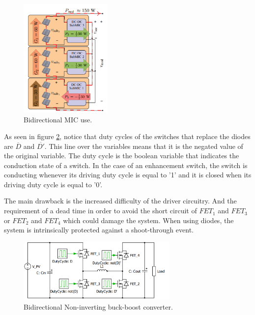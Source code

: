 \begin{figure}[htbp]
	\begin{center}
		\includegraphics[width=0.4\textwidth]{../Pictures/bidirectional_mic_use}
		\caption{Bidirectional MIC use\cite{ArchitectureMIC}.}
		\label{BID_MIC_ARCHITECTURES}
	\end{center}	
\end{figure}
		
		
As seen in figure \ref{BID_N_INV_BB_SCHEMATIC}, notice that duty cycles of the switches that replace the diodes are $\overline{D}$ and $\overline{D'}$. This line over the variables means that it is the negated value of the original variable. The duty cycle is the boolean variable that indicates the conduction state of a switch. In the case of an enhancement switch, the switch is conducting whenever its driving duty cycle is equal to '1' and it is closed when its driving duty cycle is equal to '0'. 
		
The main drawback is the increased difficulty of the driver circuitry. And the requirement of a dead time in order to avoid the short circuit of $FET_1$ and $FET_3$ or $FET_2$ and $FET_4$ which could damage the system. When using diodes, the system is intrinsically protected against a shoot-through event. 	
		
\begin{figure}[htbp]
	\begin{center}
	\includegraphics[width=0.7\textwidth]{../Pictures/BID_H_B_BB}
	\caption{Bidirectional Non-inverting buck-boost converter.}
	\label{BID_N_INV_BB_SCHEMATIC}
	\end{center}
\end{figure}



